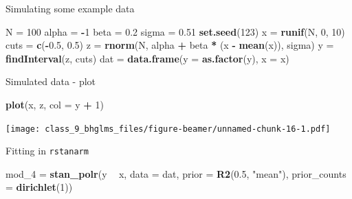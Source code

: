 \documentclass[ignorenonframetext,]{beamer}
\newenvironment{Shaded}{\begin{snugshade}}{\end{snugshade}}
\newcommand{\KeywordTok}[1]{\textcolor[rgb]{0.13,0.29,0.53}{\textbf{#1}}}
\newcommand{\DataTypeTok}[1]{\textcolor[rgb]{0.13,0.29,0.53}{#1}}
\newcommand{\DecValTok}[1]{\textcolor[rgb]{0.00,0.00,0.81}{#1}}
\newcommand{\FloatTok}[1]{\textcolor[rgb]{0.00,0.00,0.81}{#1}}
\newcommand{\StringTok}[1]{\textcolor[rgb]{0.31,0.60,0.02}{#1}}
\newcommand{\OperatorTok}[1]{\textcolor[rgb]{0.81,0.36,0.00}{\textbf{#1}}}
\newcommand{\NormalTok}[1]{#1}
\begin{document}
\begin{frame}[fragile]{Simulating some example data}

\begin{Shaded}
\begin{Highlighting}[]
\NormalTok{N =}\StringTok{ }\DecValTok{100}
\NormalTok{alpha =}\StringTok{ }\OperatorTok{-}\DecValTok{1}
\NormalTok{beta =}\StringTok{ }\FloatTok{0.2}
\NormalTok{sigma =}\StringTok{ }\FloatTok{0.51}
\KeywordTok{set.seed}\NormalTok{(}\DecValTok{123}\NormalTok{)}
\NormalTok{x =}\StringTok{ }\KeywordTok{runif}\NormalTok{(N, }\DecValTok{0}\NormalTok{, }\DecValTok{10}\NormalTok{)}
\NormalTok{cuts =}\StringTok{ }\KeywordTok{c}\NormalTok{(}\OperatorTok{-}\FloatTok{0.5}\NormalTok{, }\FloatTok{0.5}\NormalTok{)}
\NormalTok{z =}\StringTok{ }\KeywordTok{rnorm}\NormalTok{(N, alpha }\OperatorTok{+}\StringTok{ }\NormalTok{beta }\OperatorTok{*}\StringTok{ }\NormalTok{(x }\OperatorTok{-}\StringTok{ }\KeywordTok{mean}\NormalTok{(x)), sigma)}
\NormalTok{y =}\StringTok{ }\KeywordTok{findInterval}\NormalTok{(z, cuts)}
\NormalTok{dat =}\StringTok{ }\KeywordTok{data.frame}\NormalTok{(}\DataTypeTok{y =} \KeywordTok{as.factor}\NormalTok{(y),}
                 \DataTypeTok{x =}\NormalTok{ x)}
\end{Highlighting}
\end{Shaded}

\end{frame}

\begin{frame}[fragile]{Simulated data - plot}

\begin{Shaded}
\begin{Highlighting}[]
\KeywordTok{plot}\NormalTok{(x, z, }\DataTypeTok{col =}\NormalTok{ y }\OperatorTok{+}\StringTok{ }\DecValTok{1}\NormalTok{)}
\end{Highlighting}
\end{Shaded}

\texttt{[image: class\_9\_bhglms\_files/figure-beamer/unnamed-chunk-16-1.pdf]}

\end{frame}

\begin{frame}[fragile]{Fitting in \texttt{rstanarm}}

\begin{Shaded}
\begin{Highlighting}[]
\NormalTok{mod_}\DecValTok{4}\NormalTok{ =}\StringTok{ }\KeywordTok{stan_polr}\NormalTok{(y }\OperatorTok{~}\StringTok{ }\NormalTok{x, }
                   \DataTypeTok{data =}\NormalTok{ dat,}
                   \DataTypeTok{prior =} \KeywordTok{R2}\NormalTok{(}\FloatTok{0.5}\NormalTok{, }\StringTok{"mean"}\NormalTok{),}
                   \DataTypeTok{prior_counts =} \KeywordTok{dirichlet}\NormalTok{(}\DecValTok{1}\NormalTok{))}
\end{Highlighting}
\end{Shaded}

\end{frame}
\end{document}

